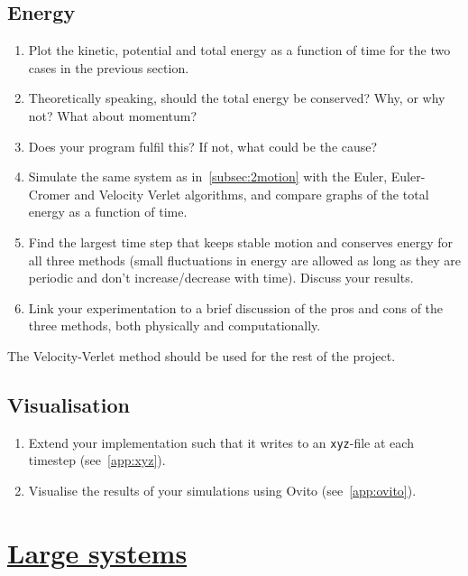 \documentclass[11pt,british,a4paper]{report}
\begin{document}
\subsection{Energy}
\begin{enumerate}[label=\roman*.]
    \item Plot the kinetic, potential and total energy as a function of time for the two cases in the previous section.
    \item Theoretically speaking, should the total energy be conserved? Why, or why not? What about momentum?
    \item Does your program fulfil this? If not, what could be the cause?
    \item Simulate the same system as in~\vref{subsec:2motion} with the Euler, Euler-Cromer and Velocity Verlet algorithms, and compare graphs of the total energy as a function of time.
    \item Find the largest time step that keeps stable motion and conserves energy for all three methods (small fluctuations in energy are allowed as long as they are periodic and don't increase/decrease with time). Discuss your results.
    \item Link your experimentation to a brief discussion of the pros and cons of the three methods, both physically and computationally.
\end{enumerate}

The Velocity-Verlet method should be used for the rest of the project.

\subsection{Visualisation}
\begin{enumerate}[label=\roman*.]
    \item Extend your implementation such that it writes to an \texttt{xyz}-file at each timestep (see~\vref{app:xyz}).
    \item Visualise the results of your simulations using Ovito (see~\vref{app:ovito}).
\end{enumerate}

\section{\underline{Large systems}}
\end{document}
